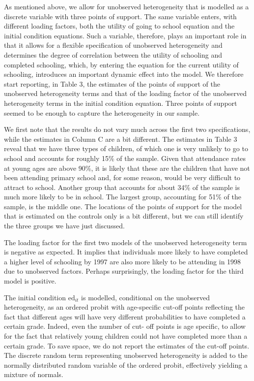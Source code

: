 \documentclass{handoutForSolutions}
\begin{document}
As mentioned above, we allow for unobserved heterogeneity that is modelled as a discrete variable with three points of support. The same variable enters, with different loading factors, both the utility of going to school equation and the initial condition equations. Such a variable, therefore, plays an important role in that it allows for a flexible specification of unobserved heterogeneity and determines the degree of correlation between the utility of schooling and completed schooling, which, by entering the equation for the current utility of schooling, introduces an important dynamic effect into the model. We therefore start reporting, in Table 3, the estimates of the points of support of the unobserved heterogeneity terms and that of the loading factor of the unobserved heterogeneity terms in the initial condition equation. Three points of support seemed to be enough to capture the heterogeneity in our sample.

We first note that the results do not vary much across the first two specifications, while the estimates in Column $\mathrm{C}$ are a bit different. The estimates in Table 3 reveal that we have three types of children, of which one is very unlikely to go to school and accounts for roughly 15\% of the sample. Given that attendance rates at young ages are above 90\%, it is likely that these are the children that have not been attending primary school and, for some reason, would be very difficult to attract to school. Another group that accounts for about 34\% of the sample is much more likely to be in school. The largest group, accounting for 51\% of the sample, is the middle one. The locations of the points of support for the model that is estimated on the controls only is a bit different, but we can still identify the three groups we have just discussed.

The loading factor for the first two models of the unobserved heterogeneity term is negative as expected. It implies that individuals more likely to have completed a higher level of schooling by 1997 are also more likely to be attending in 1998 due to unobserved factors. Perhaps surprisingly, the loading factor for the third model is positive.

The initial condition $\mathrm{e}\mathrm{d}_{it}$ is modelled, conditional on the unobserved heterogeneity, as an ordered probit with age-specific cut-off points reflecting the fact that different ages will have very different probabilities to have completed a certain grade. Indeed, even the number of cut- off points is age specific, to allow for the fact that relatively young children could not have completed more than a certain grade. To save space, we do not report the estimates of the cut-off points. The discrete random term representing unobserved heterogeneity is added to the normally distributed random variable of the ordered probit, effectively yielding a mixture of normals.
\end{document}
